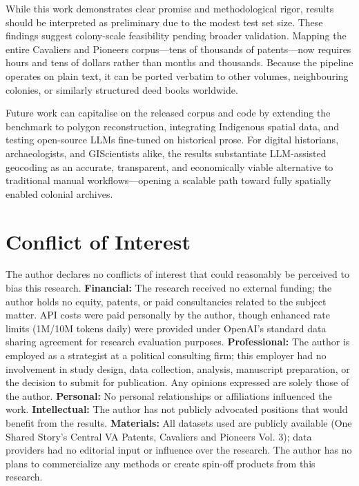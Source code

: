 While this work demonstrates clear promise and methodological rigor,
results should be interpreted as preliminary due to the modest test set
size. These findings suggest colony-scale feasibility pending broader
validation. Mapping the entire Cavaliers and Pioneers corpus---tens of
thousands of patents---now requires hours and tens of dollars rather
than months and thousands. Because the pipeline operates on plain text,
it can be ported verbatim to other volumes, neighbouring colonies, or
similarly structured deed books worldwide.

Future work can capitalise on the released corpus and code by extending
the benchmark to polygon reconstruction, integrating Indigenous spatial
data, and testing open-source LLMs fine-tuned on historical prose. For
digital historians, archaeologists, and GIScientists alike, the results
substantiate LLM-assisted geocoding as an accurate, transparent, and
economically viable alternative to traditional manual
workflows---opening a scalable path toward fully spatially enabled
colonial archives.

\section{Conflict of Interest}\label{conflict-of-interest}

The author declares no conflicts of interest that could reasonably be
perceived to bias this research. \textbf{Financial:} The research
received no external funding; the author holds no equity, patents, or
paid consultancies related to the subject matter. API costs were paid
personally by the author, though enhanced rate limits (1M/10M tokens
daily) were provided under OpenAI's standard data sharing agreement for
research evaluation purposes. \textbf{Professional:} The author is
employed as a strategist at a political consulting firm; this employer
had no involvement in study design, data collection, analysis,
manuscript preparation, or the decision to submit for publication. Any
opinions expressed are solely those of the author. \textbf{Personal:} No
personal relationships or affiliations influenced the work.
\textbf{Intellectual:} The author has not publicly advocated positions
that would benefit from the results. \textbf{Materials:} All datasets
used are publicly available (One Shared Story's Central VA Patents,
Cavaliers and Pioneers Vol. 3); data providers had no editorial input or
influence over the research. The author has no plans to commercialize
any methods or create spin-off products from this research.

